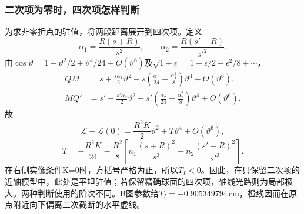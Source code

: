 \documentclass[UTF8,fontset=fandol,a4paper,11pt]{ctexart}
\begin{document}
\subsubsection*{二次项为零时，四次项怎样判断}
为求非零折点的驻值，将两段距离展开到四次项。定义
\[
\alpha_1=\frac{R(s+R)}{s^2},\qquad
\alpha_2=\frac{R(s'-R)}{s'^2}.
\]
由$\cos\vartheta=1-\vartheta^2/2+\vartheta^4/24+O(\vartheta^6)$及$\sqrt{1+\epsilon}=1+\epsilon/2-\epsilon^2/8+\cdots$，
\[
\begin{aligned}
QM&=s+\frac{s\alpha_1}{2}\vartheta^2
-s\left(\frac{\alpha_1}{24}+\frac{\alpha_1^2}{8}\right)\vartheta^4
+O(\vartheta^6),\\
MQ'&=s'-\frac{s'\alpha_2}{2}\vartheta^2
+s'\left(\frac{\alpha_2}{24}-\frac{\alpha_2^2}{8}\right)\vartheta^4
+O(\vartheta^6).
\end{aligned}
\]
故
\[
\mathcal L-\mathcal L(0)=\frac{R^2K}{2}\vartheta^2+
T\vartheta^4+O(\vartheta^6),
\]
\[
T=-\frac{R^2K}{24}
-\frac{R^2}{8}\left[
n_1\frac{(s+R)^2}{s^3}
+n_2\frac{(s'-R)^2}{s'^3}\right].
\]
在右侧实像条件K=0时，方括号严格为正，所以$T_I<0$。因此，在只保留二次项的近轴模型中，此处是平坦驻值；若保留精确球面的四次项，轴线光路则为局部极大。两种判断使用的阶次不同。B图参数给$T_I=-0.905349794\,\mathrm{cm}$，橙线因而在原点附近向下偏离二次截断的水平虚线。
\end{document}
